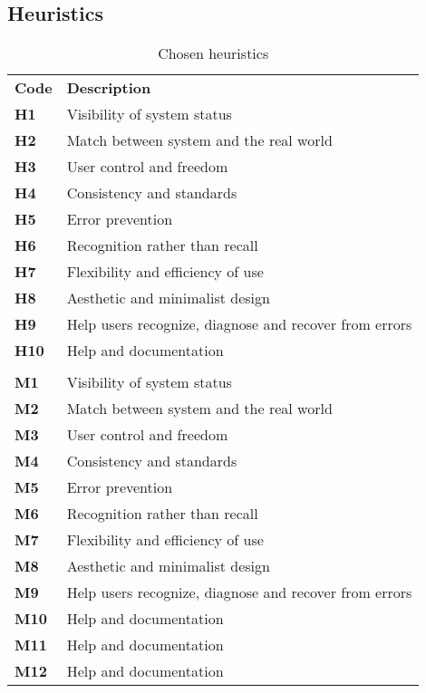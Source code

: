 \subsection{Heuristics}
\begin{table}[htp!]
    \centering
    \begin{tabular}{ |l|l| }
        \hline
        \rowcolor{unicefBlue}
        \multicolumn{2}{ |c| }{\color{white}{\textbf{Nielsen's}}}\\
        \hline
        \textbf{Code} & \textbf{Description}\\
        \hline
        \textbf{H1} & Visibility of system status\\
        \hline
        \textbf{H2} & Match between system and the real world\\
        \hline
        \textbf{H3} & User control and freedom\\
        \hline
        \textbf{H4} & Consistency and standards\\
        \hline
        \textbf{H5} & Error prevention\\
        \hline
        \textbf{H6} & Recognition rather than recall\\
        \hline
        \textbf{H7} & Flexibility and efficiency of use\\
        \hline
        \textbf{H8} & Aesthetic and minimalist design\\
        \hline
        \textbf{H9} & Help users recognize, diagnose and recover from errors\\
        \hline
        \textbf{H10} & Help and documentation\\
        \hline
        \rowcolor{unicefBlue}
        \multicolumn{2}{ |c| }{\color{white}{\textbf{MILE}}}\\
        \hline
        \textbf{M1} & Visibility of system status\\
        \hline
        \textbf{M2} & Match between system and the real world\\
        \hline
        \textbf{M3} & User control and freedom\\
        \hline
        \textbf{M4} & Consistency and standards\\
        \hline
        \textbf{M5} & Error prevention\\
        \hline
        \textbf{M6} & Recognition rather than recall\\
        \hline
        \textbf{M7} & Flexibility and efficiency of use\\
        \hline
        \textbf{M8} & Aesthetic and minimalist design\\
        \hline
        \textbf{M9} & Help users recognize, diagnose and recover from errors\\
        \hline
        \textbf{M10} & Help and documentation\\
        \hline
        \textbf{M11} & Help and documentation\\
        \hline
        \textbf{M12} & Help and documentation\\
        \hline
    \end{tabular}
    \caption{Chosen heuristics}
\end{table}